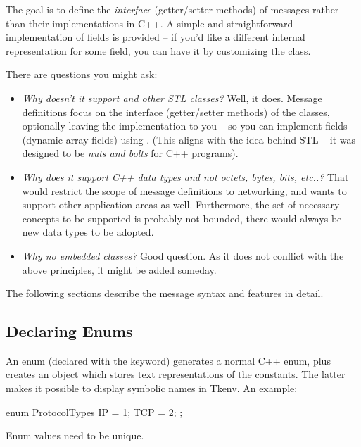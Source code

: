The goal is to define the \textit{interface} (getter/setter methods) of messages
rather than their implementations in C++. A simple and straightforward
implementation of fields is provided -- if you'd like a different internal
representation for some field, you can have it by customizing the class.

There are questions you might ask:

\begin{itemize}
  \item{\textit{Why doesn't it support  and other STL classes?}
     Well, it does. Message definitions focus on the interface
     (getter/setter methods) of the classes, optionally leaving the implementation
     to you -- so you can implement fields (dynamic array fields)
     using .
     (This aligns with the idea behind STL -- it was designed to be
     \textit{nuts and bolts} for C++ programs).}
  \item{\textit{Why does it support C++ data types and not octets,
     bytes, bits, etc..?}
     That would restrict the scope of message definitions to networking,
     and {\opp} wants to support other application areas as well.
     Furthermore, the set of necessary concepts to be supported is
     probably not bounded, there would always be new data types to
     be adopted.}
  \item{\textit{Why no embedded classes?} Good question. As it does not
     conflict with the above principles, it might be added someday.}
\end{itemize}



The following sections describe the message syntax and features in detail.


\subsection{Declaring Enums}

An enum (declared with the  keyword) generates a normal C++
enum, plus creates an object which stores text representations of the
constants. The latter makes it possible to display symbolic names in Tkenv.
An example:

\begin{msg}
enum ProtocolTypes
{
   IP = 1;
   TCP = 2;
};
\end{msg}

Enum values need to be unique.


%

